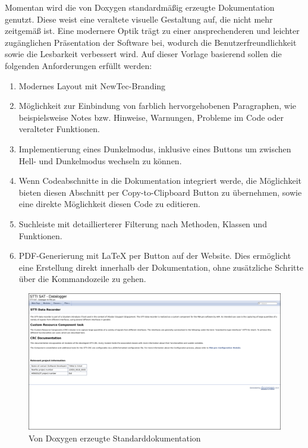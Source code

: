\documentclass[11pt,a4paper]{report}
\begin{document}
Momentan wird die von Doxygen standardmäßig erzeugte Dokumentation genutzt. Diese weist eine veraltete visuelle Gestaltung auf, die nicht mehr zeitgemäß ist. Eine modernere Optik trägt zu einer ansprechenderen und leichter zugänglichen Präsentation der Software bei, wodurch die Benutzerfreundlichkeit sowie die Lesbarkeit verbessert wird. Auf dieser Vorlage basierend sollen die folgenden Anforderungen erfüllt werden:
\begin{enumerate}[label=\textbf{A.\arabic*}]
    \item \label{req:Layout} Modernes Layout mit NewTec-Branding
    \item \label{req:Notes} Möglichkeit zur Einbindung von farblich hervorgehobenen Paragraphen, wie beispielsweise Notes bzw. Hinweise, Warnungen, Probleme im Code oder veralteter Funktionen.
    \item \label{req:Darkmode} Implementierung eines Dunkelmodus, inklusive eines Buttons um zwischen Hell- und Dunkelmodus wechseln zu können.
    \item \label{req:Copy} Wenn Codeabschnitte in die Dokumentation integriert werde, die Möglichkeit bieten diesen Abschnitt per Copy-to-Clipboard Button zu übernehmen, sowie eine direkte Möglichkeit diesen Code zu editieren.
    \item \label{req:Search} Suchleiste mit detaillierterer Filterung nach Methoden, Klassen und Funktionen.
    \item \label{req:PDF} PDF-Generierung mit LaTeX per Button auf der Website. Dies ermöglicht eine Erstellung direkt innerhalb der Dokumentation, ohne zusätzliche Schritte über die Kommandozeile zu gehen.
\end{enumerate}


\begin{figure}[h]
    \centering
     \includegraphics[width=\textwidth]{images/Doxygen_vorher.png}
    \caption{Von Doxygen erzeugte Standarddokumentation}
    \label{fig:doxygen-befor}
\end{figure}
\newpage
\end{document}
